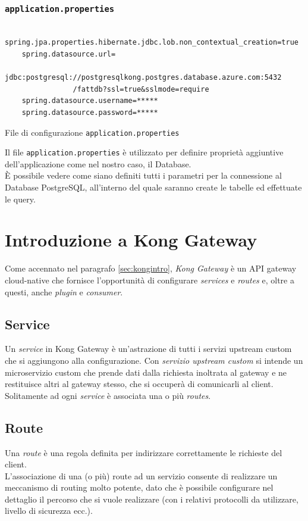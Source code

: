 \subsubsection{\texttt{application.properties}}
\begin{algorithm}
\centering
\begin{verbatim}
	spring.jpa.properties.hibernate.jdbc.lob.non_contextual_creation=true
	spring.datasource.url=
		jdbc:postgresql://postgresqlkong.postgres.database.azure.com:5432
				/fattdb?ssl=true&sslmode=require
	spring.datasource.username=*****
	spring.datasource.password=*****
\end{verbatim}
\caption{File di configurazione \texttt{application.properties}}\label{alg:applicationproperties}
\end{algorithm}
Il file \texttt{application.properties} è utilizzato per definire proprietà aggiuntive dell'applicazione come nel nostro caso, il Database.\\
È possibile vedere come siano definiti tutti i parametri per la connessione al Database PostgreSQL, all'interno del quale saranno 
create le tabelle ed effettuate le query.

\newpage

\section{Introduzione a Kong Gateway}\label{sec:kongprog}
Come accennato nel paragrafo \ref{sec:kongintro}, \emph{Kong Gateway} è un API gateway cloud-native che fornisce l'opportunità di configurare \emph{services} e \emph{routes} e, oltre a questi, anche \emph{plugin} e \emph{consumer}.
\subsection{Service}\label{sec:kongservice}
Un \emph{service} in Kong Gateway è un'astrazione di tutti i servizi upstream custom che si aggiungono alla configurazione. Con \emph{servizio upstream custom} si intende un microservizio custom che prende dati dalla richiesta inoltrata al gateway e ne restituisce altri al gateway stesso, che si occuperà di comunicarli al client.\\
Solitamente ad ogni \emph{service} è associata una o più \emph{routes}. \cite{Kong}\\

\subsection{Route}\label{sec:kongroute}
Una \emph{route} è una regola definita per indirizzare correttamente le richieste del client.\\
L'associazione di una (o più) route ad un servizio consente di realizzare un meccanismo di routing molto potente, dato che è possibile configurare
 nel dettaglio il percorso che si vuole realizzare (con i relativi protocolli da utilizzare, livello di sicurezza ecc.). \cite{Kong}


